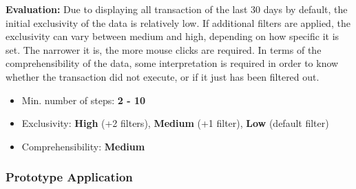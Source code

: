 \textbf{Evaluation:} Due to displaying all transaction of the last 30 days by default, the initial exclusivity of the data is relatively low. If additional filters are applied, the exclusivity can vary between medium and high, depending on how specific it is set. The narrower it is, the more mouse clicks are required. In terms of the comprehensibility of the data, some interpretation is required in order to know whether the transaction did not execute, or if it just has been filtered out.
\begin{itemize}[noitemsep,nolistsep]
	\item Min. number of steps: \textbf{2 - 10}
	\item Exclusivity: \textbf{High} (+2 filters), \textbf{Medium} (+1 filter), \textbf{Low} (default filter)
	\item Comprehensibility: \textbf{Medium}
\end{itemize}



\subsubsection{Prototype Application}


